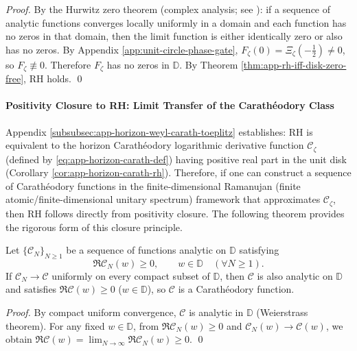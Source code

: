 \begin{proof}
By the Hurwitz zero theorem (complex analysis; see \cite[Chapter~4]{Ahlfors1979ComplexAnalysis}): if a sequence of analytic functions converges locally uniformly in a domain and each function has no zeros in that domain, then the limit function is either identically zero or also has no zeros.
By Appendix \ref{app:unit-circle-phase-gate}, \(F_{\zeta}(0)=\Xi_{\zeta}(-\tfrac12)\neq 0\), so \(F_{\zeta}\not\equiv 0\).
Therefore \(F_{\zeta}\) has no zeros in \(\mathbb{D}\).
By Theorem \ref{thm:app-rh-iff-disk-zero-free}, RH holds. \qed
\end{proof}

\paragraph{Positivity Closure to RH: Limit Transfer of the Carath\'eodory Class}
Appendix \ref{subsubsec:app-horizon-weyl-carath-toeplitz} establishes: RH is equivalent to the horizon Carath\'eodory logarithmic derivative function \(\mathscr{C}_{\zeta}\) (defined by \eqref{eq:app-horizon-carath-def}) having positive real part in the unit disk (Corollary \ref{cor:app-horizon-carath-rh}).
Therefore, if one can construct a sequence of Carath\'eodory functions in the finite-dimensional Ramanujan (finite atomic/finite-dimensional unitary spectrum) framework that approximates \(\mathscr{C}_{\zeta}\), then RH follows directly from positivity closure.
The following theorem provides the rigorous form of this closure principle.

\begin{theorem}\label{thm:xi-horizon-carath-closure}
Let \(\{\mathscr{C}_N\}_{N\ge 1}\) be a sequence of functions analytic on \(\mathbb{D}\) satisfying
\[
\Re \mathscr{C}_N(w)\ge 0,\qquad w\in\mathbb{D}\quad(\forall N\ge 1).
\]
If \(\mathscr{C}_N\to \mathscr{C}\) uniformly on every compact subset of \(\mathbb{D}\), then \(\mathscr{C}\) is also analytic on \(\mathbb{D}\) and satisfies \(\Re \mathscr{C}(w)\ge 0\) (\(w\in\mathbb{D}\)), so \(\mathscr{C}\) is a Carath\'eodory function.
\end{theorem}

\begin{proof}
By compact uniform convergence, \(\mathscr{C}\) is analytic in \(\mathbb{D}\) (Weierstrass theorem).
For any fixed \(w\in\mathbb{D}\), from \(\Re \mathscr{C}_N(w)\ge 0\) and \(\mathscr{C}_N(w)\to \mathscr{C}(w)\), we obtain \(\Re \mathscr{C}(w)=\lim_{N\to\infty}\Re \mathscr{C}_N(w)\ge 0\).
\qed
\end{proof}

